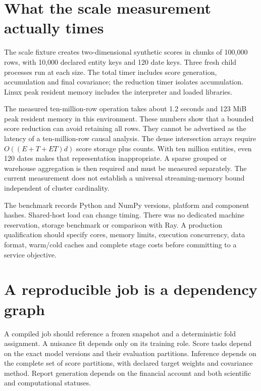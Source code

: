 \section{What the scale measurement actually times}
The scale fixture creates two-dimensional synthetic scores in chunks of
100,000 rows, with 10,000 declared entity keys and 120 date keys. Three
fresh child processes run at each size. The total timer includes score
generation, accumulation and final covariance; the reduction timer isolates
accumulation. Linux peak resident memory includes the interpreter and
loaded libraries.

\begin{table}[htbp]\centering\small

\caption{Median of three local runs per size. Precomputed-score reduction
only: no storage reads, temporal reconstruction, nuisance fitting, causal
graph search or POMDP parameter fitting is included.}
\label{tab:scale-results}
\end{table}

The measured ten-million-row operation takes about 1.2 seconds and
123 MiB peak resident memory in this environment. These numbers show
that a bounded score reduction can avoid retaining all rows. They cannot
be advertised as the latency of a ten-million-row causal analysis.
The dense intersection arrays require
$O((E+T+ET)d)$ score storage plus counts. With ten million entities,
even 120 dates makes that representation inappropriate. A sparse grouped
or warehouse aggregation is then required and must be measured separately.
The current measurement does not establish a universal streaming-memory
bound independent of cluster cardinality.

The benchmark records Python and NumPy versions, platform and component
hashes. Shared-host load can change timing. There was no dedicated machine
reservation, storage benchmark or comparison with Ray. A production
qualification should specify cores, memory limits, execution concurrency,
data format, warm/cold caches and complete stage costs before committing
to a service objective.

\section{A reproducible job is a dependency graph}
A compiled job should reference a frozen snapshot and a deterministic fold
assignment. A nuisance fit depends only on its training role. Score tasks
depend on the exact model versions and their evaluation partitions.
Inference depends on the complete set of score partitions, with declared
target weights and covariance method. Report generation depends on the
financial account and both scientific and computational statuses.

